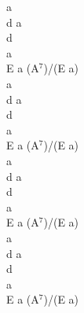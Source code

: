 \documentclass[a5paper, 10pt]{book}
\begin{document}
\begin{minipage}[b]{0.2\textwidth}
  a\\
  d a\\
  d\\
  a\\
  E a (A$^7$)/(E a)\\

  a\\
  d a\\
  d\\
  a\\
  E a (A$^7$)/(E a)\\

  a\\
  d a\\
  d\\
  a\\
  E a (A$^7$)/(E a)\\

  a\\
  d a\\
  d\\
  a\\
  E a (A$^7$)/(E a)\\
\end{minipage}

\newpage
\end{document}
